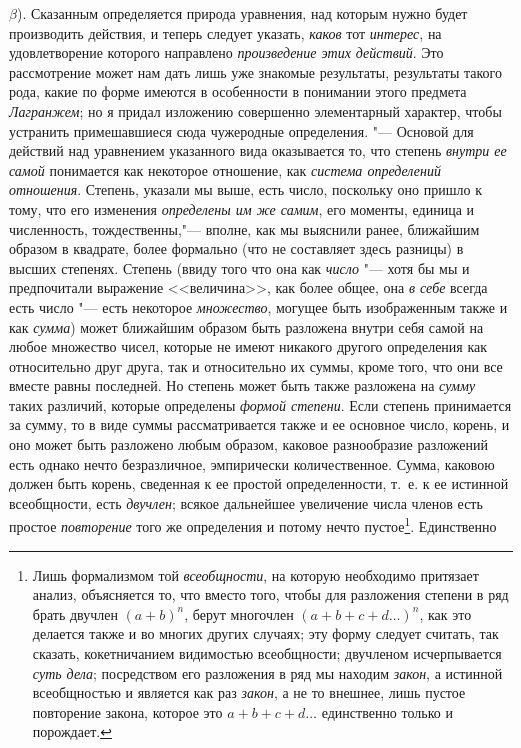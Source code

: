 $\beta $). Сказанным определяется природа уравнения, над которым нужно будет
производить действия, и теперь следует указать,
{\em каков} тот {\em интерес}, на
удовлетворение которого направлено {\em произведение
этих действий}. Это рассмотрение может нам дать лишь уже знакомые
результаты, результаты такого рода, какие по форме имеются в особенности в
понимании этого предмета {\em Лагранжем}; но я придал
изложению совершенно элементарный характер, чтобы устранить примешавшиеся
сюда чужеродные определения. "--- Основой для действий над уравнением
указанного вида оказывается то, что степень {\em внутри
ее самой} понимается как некоторое отношение, как
{\em система определений отношения}. Степень, указали
мы выше, есть число, поскольку оно пришло к тому, что его изменения
{\em определены им же самим}, его моменты, единица и
численность, тождественны,"--- вполне, как мы выяснили ранее, ближайшим
образом в квадрате, более формально (что не составляет здесь разницы) в
высших степенях. Степень (ввиду того что она как
{\em число} "--- хотя бы мы и предпочитали выражение
<<величина>>, как более общее, она {\em в себе} всегда
есть число "--- есть некоторое {\em множество}, могущее
быть изображенным также и как {\em сумма}) может
ближайшим образом быть разложена внутри себя самой на любое множество
чисел, которые не имеют никакого другого определения как относительно друг
друга, так и относительно их суммы, кроме того, что они все вместе равны
последней. Но степень может быть также разложена на
{\em сумму} таких различий, которые определены
{\em формой степени}. Если степень принимается за
сумму, то в виде суммы рассматривается также и ее основное число, корень, и
оно может быть разложено любым образом, каковое разнообразие разложений
есть однако нечто безразличное, эмпирически количественное. Сумма, каковою
должен быть корень, сведенная к ее простой определенности, т.~е. к ее
истинной всеобщности, есть {\em двучлен}; всякое
дальнейшее увеличение числа членов есть простое
{\em повторение} того же определения и потому нечто
пустое\footnote{Лишь формализмом той {\em всеобщности}, на
которую необходимо притязает анализ, объясняется то, что вместо того, чтобы
для разложения степени в ряд брать двучлен $(a + b)^n$,
берут многочлен $(a + b + c + d \dots)^n$, как
это делается также и во многих других случаях; эту форму следует считать,
так сказать, кокетничанием видимостью всеобщности; двучленом исчерпывается
{\em суть дела}; посредством его разложения в ряд мы находим
{\em закон}, а истинной всеобщностью и является как раз
{\em закон}, а не то внешнее, лишь пустое повторение закона, которое это
$ a + b + c + d \dots $ единственно только и порождает.}. Единственно
